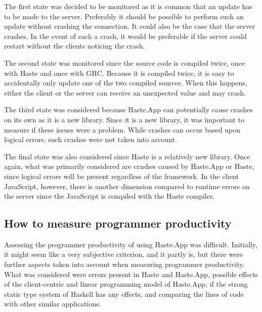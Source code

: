 \documentclass[a4paper]{article}
\begin{document}
The first state was decided to be monitored as it is common that an update has to be made to the server. Preferably it should be possible to perform such an update without crashing the connection. It could also be the case that the server crashes. In the event of such a crash, it would be preferable if the server could restart without the clients noticing the crash.

The second state was monitored since the source code is compiled twice, once with Haste and once with GHC. Because it is compiled twice, it is easy to accidentally only update one of the two compiled sources. When this happens, either the client or the server can receive an unexpected value and may crash.

The third state was considered because Haste.App can potentially cause crashes on its own as it is a new library. Since it is a new library, it was important to measure if these issues were a problem. While crashes can occur based upon logical errors, such crashes were not taken into account. 

The final state was also considered since Haste is a relatively new library. Once again, what was primarily considered are crashes caused by Haste.App or Haste, since logical errors will be present regardless of the framework. In the client JavaScript, however, there is another dimension compared to runtime errors on the server since the JavaScript is compiled with the Haste compiler. 



\subsection{How to measure programmer productivity}
\label{sub:method-programmer-productivity}
Assessing the programmer productivity of using Haste.App was difficult. Initially, it might seem like a very subjective criterion, and it partly is, but there were further aspects taken into account when measuring programmer productivity. What was considered were errors present in Haste and Haste.App, possible effects of the client-centric and linear programming model of Haste.App, if the strong static type system of Haskell has any effects, and comparing the lines of code with other similar applications.
\end{document}
